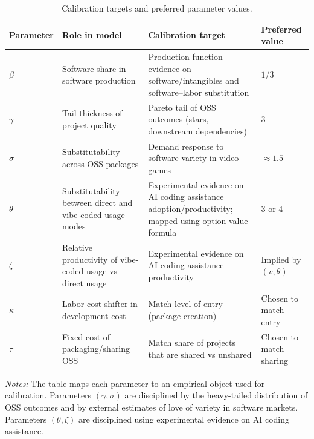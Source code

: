 \documentclass[11pt,a4paper]{article}
\theoremstyle{definition}
\theoremstyle{remark}
\begin{document}
\begin{table}[t]
\centering
\caption{Calibration targets and preferred parameter values.}
\label{tab:calibration}
\small
\setlength{\tabcolsep}{4pt}
\renewcommand{\arraystretch}{1.15}
\begin{tabularx}{\textwidth}{l X X l}
\toprule
Parameter & Role in model & Calibration target & Preferred value \\
\midrule
$\beta$ & Software share in software production & Production-function evidence on software/intangibles and software--labor substitution \citep{shin-2022-productivity,friesenbichler-2024-intangible-capital} & $1/3$ \\
$\gamma$ & Tail thickness of project quality & Pareto tail of OSS outcomes (stars, downstream dependencies) & $3$ \\
$\sigma$ & Substitutability across OSS packages & Demand response to software variety in video games \citep{clements-ohashi-2005} & $\approx 1.5$ \\
$\theta$ & Substitutability between direct and vibe-coded usage modes & Experimental evidence on AI coding assistance adoption/productivity; mapped using option-value formula \citep{peng-2023-copilot-productivity,cui-demirer-jaffe-musolff-peng-salz-2025} & $3$ or $4$ \\
$\zeta$ & Relative productivity of vibe-coded usage vs direct usage & Experimental evidence on AI coding assistance productivity \citep{peng-2023-copilot-productivity,cui-demirer-jaffe-musolff-peng-salz-2025} & Implied by $(v,\theta)$ \\
$\kappa$ & Labor cost shifter in development cost & Match level of entry (package creation) & Chosen to match entry \\
$\tau$ & Fixed cost of packaging/sharing OSS & Match share of projects that are shared vs unshared & Chosen to match sharing \\
\bottomrule
\end{tabularx}
\begin{flushleft}
\footnotesize
\emph{Notes:} The table maps each parameter to an empirical object used for calibration. Parameters $(\gamma,\sigma)$ are disciplined by the heavy-tailed distribution of OSS outcomes and by external estimates of love of variety in software markets. Parameters $(\theta,\zeta)$ are disciplined using experimental evidence on AI coding assistance.
\end{flushleft}
\end{table}
\end{document}
